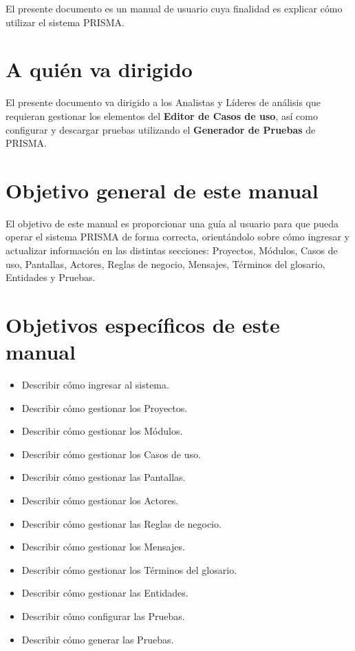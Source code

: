El presente documento es un manual de usuario cuya finalidad es explicar cómo utilizar el sistema PRISMA.\\

\section{A quién va dirigido}

El presente documento va dirigido a los Analistas y Líderes de análisis que requieran gestionar los elementos del {\bf Editor de Casos de uso}, así como configurar y descargar pruebas utilizando el {\bf Generador de Pruebas} de PRISMA.\\


\section{Objetivo general de este manual}
\label{sec:ObjetivoGeneralManual}

El objetivo de este manual es proporcionar una guía al usuario para que pueda operar el sistema PRISMA de forma correcta, orientándolo sobre cómo ingresar y 
actualizar información en las distintas secciones: Proyectos, Módulos, Casos de uso, Pantallas, Actores, Reglas de negocio, Mensajes, Términos del glosario, Entidades y Pruebas.\\


\section{Objetivos específicos de este manual}

\begin{itemize}
	\item Describir cómo ingresar al sistema.
	\item Describir cómo gestionar los Proyectos.
	\item Describir cómo gestionar los Módulos.
	\item Describir cómo gestionar los Casos de uso.
	\item Describir cómo gestionar las Pantallas.
	\item Describir cómo gestionar los Actores.
	\item Describir cómo gestionar las Reglas de negocio.
	\item Describir cómo gestionar los Mensajes.
	\item Describir cómo gestionar los Términos del glosario.
	\item Describir cómo gestionar las Entidades.
	\item Describir cómo configurar las Pruebas.
	\item Describir cómo generar las Pruebas.
\end{itemize}
